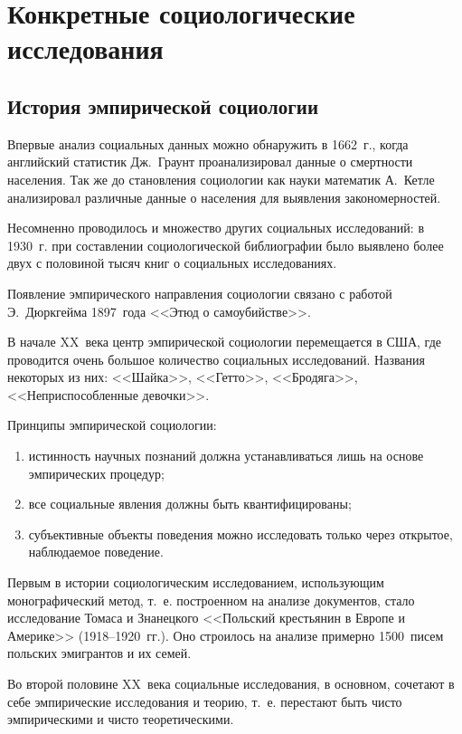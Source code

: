 \chapter{Конкретные социологические исследования}
\section{История эмпирической социологии}

  Впервые анализ социальных данных можно обнаружить в 1662~г., когда английский
  статистик Дж.~Граунт проанализировал данные о смертности населения. Так же до
  становления социологии как науки математик А.~Кетле анализировал различные
  данные о населения для выявления закономерностей.
  
  Несомненно проводилось и множество других социальных исследований: в 1930~г.
  при составлении социологической библиографии было выявлено более двух с
  половиной тысяч книг о социальных исследованиях.
  
  \charskip{*}
  
  Появление эмпирического направления социологии связано с работой Э.~Дюркгейма
  1897~года <<Этюд о самоубийстве>>.
  
  В начале XX~века центр эмпирической социологии перемещается в США, где
  проводится очень большое количество социальных исследований. Названия
  некоторых из них: <<Шайка>>, <<Гетто>>, <<Бродяга>>, <<Неприспособленные
  девочки>>.
  
  \charskip{*}
  
  Принципы эмпирической социологии:
  \begin{enumerate}
    \item истинность научных познаний должна устанавливаться лишь на основе
      эмпирических процедур;
    \item все социальные явления должны быть квантифицированы;
    \item субъективные объекты поведения можно исследовать только через
      открытое, наблюдаемое поведение.
  \end{enumerate}
  
  \charskip{*}
  
  Первым в истории социологическим исследованием, использующим монографический
  метод, т.~е. построенном на анализе документов, стало исследование Томаса и
  Знанецкого <<Польский крестьянин в Европе и Америке>> (1918--1920~гг.). Оно
  строилось на анализе примерно 1500~писем польских эмигрантов и их семей.
  
  Во второй половине XX~века социальные исследования, в основном, сочетают в
  себе эмпирические исследования и теорию, т.~е. перестают быть чисто
  эмпирическими и чисто теоретическими.

